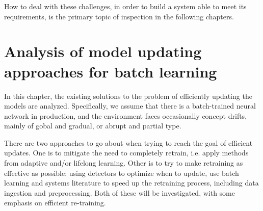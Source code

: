 How to deal with these challenges, in order to build a system able to meet its requirements, is the primary topic of inspection in the following chapters.







\chapter{Analysis of model updating approaches for batch learning}


In this chapter, the existing solutions to the problem of efficiently updating the models are analyzed. Specifically, we assume that there is a batch-trained neural network in production, and the environment faces occasionally concept drifts, mainly of gobal and gradual, or abrupt and partial type.

There are two approaches to go about when trying to reach the goal of efficient updates. One is to mitigate the need to completely retrain, i.e. apply methods from adaptive and/or lifelong learning. Other is to try to make retraining as effective as possible: using detectors to optimize when to update, use batch learning and systems literature to speed up the retraining process, including data ingestion and preprocessing. Both of these will be investigated, with some emphasis on efficient re-training.

